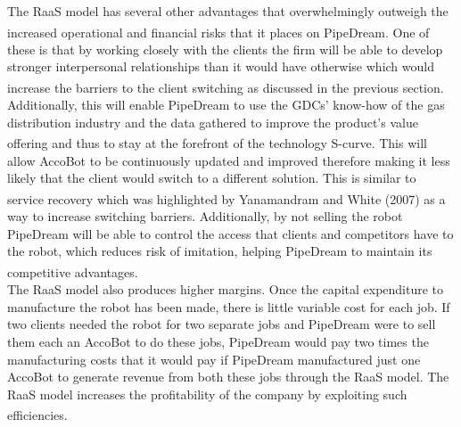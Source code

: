 \documentclass[11pt]{article}		%
\newcommand{\supercite}[1]{\textsuperscript{\cite{#1}}}		%
\begin{document}
            \hspace*{2ex}The RaaS model has several other advantages that overwhelmingly outweigh the increased operational and financial risks that it places on PipeDream\supercite{RaaS}. One of these is that by working closely with the clients the firm will be able to develop stronger interpersonal relationships than it would have otherwise which would increase the barriers to the client switching\supercite{B2Brelations} as discussed in the previous section. Additionally, this will enable PipeDream to use the GDCs' know-how of the gas distribution industry and the data gathered to improve the product’s value offering and thus to stay at the forefront of the technology S-curve\supercite{Barney}. This will allow AccoBot to be continuously updated and improved therefore making it less likely that the client would switch to a different solution. This is similar to service recovery which was highlighted by Yanamandram and White (2007)\supercite{customers} as a way to increase switching barriers. Additionally, by not selling the robot PipeDream will be able to control the access that clients and competitors have to the robot, which reduces risk of imitation, helping PipeDream to maintain its competitive advantages\supercite{Barney}.
            \\
            \hspace*{2ex}The RaaS model also produces higher margins. Once the capital expenditure to manufacture the robot has been made, there is little variable cost for each job. If two clients needed the robot for two separate jobs and PipeDream were to sell them each an AccoBot to do these jobs, PipeDream would pay two times the manufacturing costs that it would pay if PipeDream manufactured just one AccoBot to generate revenue from both these jobs through the RaaS model. The RaaS model increases the profitability of the company by exploiting such efficiencies\supercite{monetise_RaaS}.
\end{document}
